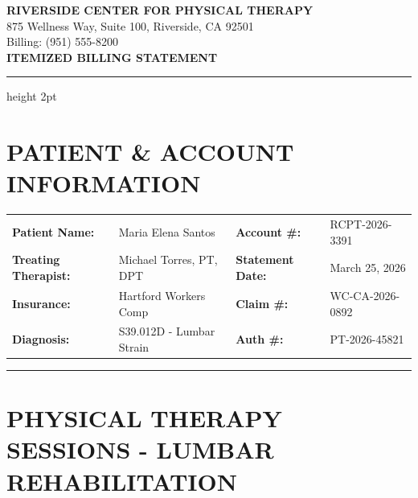 \documentclass[11pt]{article}
\begin{document}
\begin{center}
{\Large\bfseries\color{medblue} RIVERSIDE CENTER FOR PHYSICAL THERAPY}\\[0.3em]
{\small 875 Wellness Way, Suite 100, Riverside, CA 92501}\\
{\small Billing: (951) 555-8200}\\[1em]
{\LARGE\bfseries ITEMIZED BILLING STATEMENT}
\end{center}

\vspace{0.5em}
\hrule height 2pt
\vspace{1em}

\section*{PATIENT \& ACCOUNT INFORMATION}

\begin{tabular}{@{}p{4cm}p{5cm}p{3.5cm}p{4cm}@{}}
\textbf{Patient Name:} & Maria Elena Santos & \textbf{Account \#:} & RCPT-2026-3391 \\
\textbf{Treating Therapist:} & Michael Torres, PT, DPT & \textbf{Statement Date:} & March 25, 2026 \\
\textbf{Insurance:} & Hartford Workers Comp & \textbf{Claim \#:} & WC-CA-2026-0892 \\
\textbf{Diagnosis:} & S39.012D - Lumbar Strain & \textbf{Auth \#:} & PT-2026-45821 \\
\end{tabular}

\vspace{1em}
\hrule
\vspace{1em}

\section*{PHYSICAL THERAPY SESSIONS - LUMBAR REHABILITATION}
\end{document}
